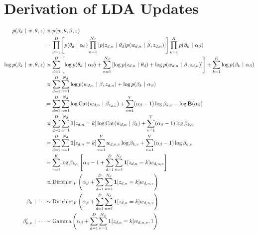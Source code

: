 \documentclass[11pt,letterpaper]{article}
\begin{document}
\section{Derivation of LDA Updates}
\begin{align}
p(\beta_k ~\vert~ w, \theta, z) &\propto  p(w, \theta, \beta, z) \\
&= \prod_{d=1}^D \left[ p(\theta_d ~\vert~ \alpha_\theta) \prod_{n=1}^{N_d} \left[ p(z_{d,n} ~\vert~ \theta_d) p(w_{d,n} ~\vert~ \beta, z_{d,n})\right] \right] \prod_{k=1}^K p(\beta_k ~\vert~ \alpha_\beta) \\
\log p(\beta_k ~\vert~ w, \theta, z) &\propto \sum_{d=1}^D \left[ \log p(\theta_d ~\vert~ \alpha_\theta) + \sum_{n=1}^{N_d} \left[ \log p(z_{d,n} ~\vert~ \theta_d) + \log p(w_{d,n} ~\vert~ \beta, z_{d,n})\right] \right] + \sum_{k=1}^K \log p(\beta_k ~\vert~ \alpha_\beta) \\
&\propto \sum_{d=1}^D \sum_{n=1}^{N_d} \log p(w_{d,n} ~\vert~ \beta, z_{d,n}) + \log p(\beta_k ~\vert~ \alpha_\beta) \\
&= \sum_{d=1}^D \sum_{n=1}^{N_d} \log \mbox{Cat}(w_{d,n} ~\vert~ \beta_{z_{d,n}}) + \sum_{v=1}^V (\alpha_\beta-1) \log \beta_{k,v} - \log \mathbf{B}(\bar{\alpha}_\beta) \\
&\propto \sum_{d=1}^D \sum_{n=1}^{N_d} \mathbf{1}[z_{d,n} = k] \log \mbox{Cat}(w_{d,n} ~\vert~ \beta_k) + \sum_{v=1}^V (\alpha_\beta-1) \log \beta_{k,v} \\
&= \sum_{d=1}^D \sum_{n=1}^{N_d} \mathbf{1}[z_{d,n} = k] \sum_{v=1}^V w_{d,n,v} \log \beta_{k,v} + \sum_{v=1}^V (\alpha_\beta -1) \log \beta_{k,v} \\
&= \sum_{v=1}^K \log \beta_{k,v} \left[ \alpha_\beta - 1 + \sum_{d=1}^D \sum_{n=1}^{N_d} \mathbf{1}[z_{d,n} = k] w_{d,n,v} \right] \\
&\propto \mbox{Dirichlet}_V\left(\alpha_\beta + \sum_{d=1}^D \sum_{n=1}^{N_d} \mathbf{1}[z_{d,n} = k] w_{d,n,v}\right) \\
\beta_{k} ~\vert~ \cdots &\sim \mbox{Dirichlet}_V\left(\alpha_\beta + \sum_{d=1}^D \sum_{n=1}^{N_d} \mathbf{1}[z_{d,n} = k] w_{d,n,v}\right) \\
\beta'_{k,v} ~\vert~ \cdots &\sim \mbox{Gamma}\left(\alpha_\beta + \sum_{d=1}^D \sum_{n=1}^{N_d} \mathbf{1}[z_{d,n} = k] w_{d,n,v}, 1\right)
\end{align}
\end{document}

